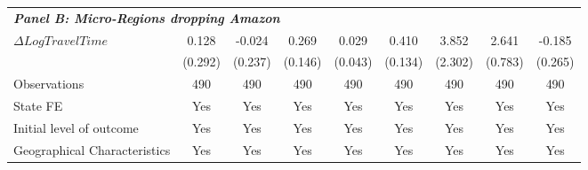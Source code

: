 \begin{table}
{\begin{tabular}{l*{8}{c}}
\multicolumn{8}{l}{\linebreak \textbf{\textit{Panel B: Micro-Regions dropping Amazon}}} \\
$\Delta Log Travel Time$&       0.128         &      -0.024         &       0.269\sym{*}  &       0.029         &       0.410\sym{***}&       3.852         &       2.641\sym{***}&      -0.185         \\
&     (0.292)         &     (0.237)         &     (0.146)         &     (0.043)         &     (0.134)         &     (2.302)         &     (0.783)         &     (0.265)         \\
\hline
Observations        &         490         &         490         &         490         &         490         &         490         &         490         &         490         &         490         \\
State FE            &         Yes         &         Yes         &         Yes         &         Yes         &         Yes         &         Yes         &         Yes         &         Yes         \\
Initial level of outcome&         Yes         &         Yes         &         Yes         &         Yes         &         Yes         &         Yes         &         Yes         &         Yes         \\
Geographical Characteristics&         Yes         &         Yes         &         Yes         &         Yes         &         Yes         &         Yes         &         Yes         &         Yes         \\
\hline


\end{tabular}}
\end{table}
